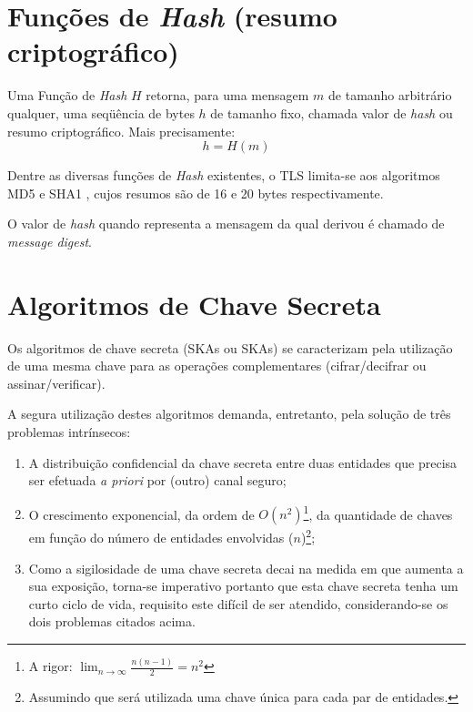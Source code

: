 \section{Funções de \emph{Hash} (resumo criptográfico)}

Uma Função de \emph{Hash} $H$ retorna, para uma mensagem $m$ de tamanho arbitrário 
qualquer, uma seqüência de bytes $h$ de tamanho fixo, chamada valor de \emph{hash} ou 
resumo criptográfico. Mais precisamente:
\[ h = H(m) \]

Dentre as diversas funções de \emph{Hash} existentes, o TLS limita-se aos algoritmos \acs{MD5} \cite{rfc_md5} e 
\acs{SHA1} \cite{fips_sha1}, cujos resumos são de 16 e 20 bytes respectivamente.

O valor de \emph{hash} quando representa a mensagem da qual derivou é chamado
de \emph{message digest}.

\section{Algoritmos de Chave Secreta}

Os algoritmos de chave secreta (\aclp{SKA} ou \acsp{SKA}) se caracterizam pela utilização de uma mesma chave para as 
operações complementares (cifrar/decifrar ou assinar/verificar).

A segura utilização destes algoritmos demanda, entretanto, pela solução de três problemas intrínsecos:

\begin{enumerate}
\item A distribuição confidencial da chave secreta entre duas entidades que precisa ser
efetuada \emph{a priori} por (outro) canal seguro;
\item O crescimento exponencial, da ordem de $O(n^2)$\footnote{A rigor: 
$\lim_{n \to \infty} \frac{n (n - 1)}{2} = n^2$},
da quantidade de chaves em função do número de entidades envolvidas ($n$)\footnote{Assumindo 
que será utilizada uma chave única para cada par de entidades.};
\item Como a sigilosidade de uma chave secreta decai na medida em que aumenta a sua exposição, torna-se
imperativo portanto que esta chave secreta tenha um curto ciclo de vida, requisito este difícil de 
ser atendido, considerando-se os dois problemas citados acima.
\end{enumerate}


